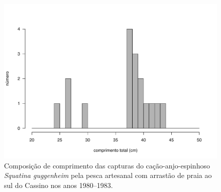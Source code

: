 \documentclass[a4paper,11pt,twoside,showtrims,onecolumn,openright,final]{memoir}
\begin{document}
%
%

\begin{figure}
\begin{center}
\includegraphics[width=\textwidth]{GUGGENHEIM_HISTOGRAMAPRAIA}
\end{center}
\caption[Composição de comprimento das capturas  do cação-anjo-espinhoso \emph{Squatina guggenheim} 
	 pela pesca artesanal com arrastão de praia]
	{Composição de comprimento das capturas  do cação-anjo-espinhoso \emph{Squatina guggenheim} 
	 pela pesca artesanal com arrastão de praia ao sul do Cassino nos anos 1980--1983.}
\label{fig:guggenheim-distrib-arrasto1980}
\end{figure}


%
%
\end{document}
